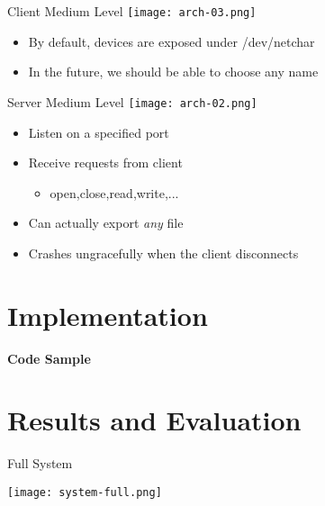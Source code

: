 \documentclass[xcolor=dvipsnames]{beamer}
\begin{document}
\begin{frame}[c]{Client Medium Level}
  \texttt{[image: arch-03.png]}

  \begin{itemize}
    \item<1-> By default, devices are exposed under /dev/netchar
    \item<2-> In the future, we should be able to choose any name
  \end{itemize}
\end{frame}

\begin{frame}[c]{Server Medium Level}
  \texttt{[image: arch-02.png]}
  \begin{itemize}
    \item<1-> Listen on a specified port
    \item<2-> Receive requests from client
    \begin{itemize}
      \item<2-> open,close,read,write,...
    \end{itemize}
    \item<3-> Can actually export \textit{any} file
    \item<4-> Crashes ungracefully when the client disconnects
  \end{itemize}
\end{frame}

\section{Implementation}

\begin{frame}{\bf Code Sample}
  


\end{frame}



\section{Results and Evaluation}

\begin{frame}[c]{Full System}
  \begin{center}
    \texttt{[image: system-full.png]}
  \end{center}
\end{frame}
\end{document}
